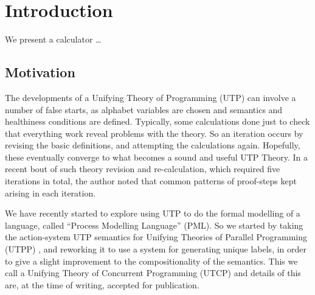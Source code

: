 \section{Introduction}\label{sec:Intro}

We present a calculator \dots

\subsection{Motivation}

The developments of a Unifying Theory of Programming (UTP)
can involve a number of false starts,
as alphabet variables are chosen
and semantics and healthiness conditions are defined.
Typically, some calculations done just to check that everything
work reveal problems with the theory.
So an iteration occurs by revising the basic definitions,
and attempting the calculations again.
Hopefully, these eventually converge to what becomes a sound and useful
UTP Theory.
In a recent bout of such theory revision and re-calculation,
which required five iterations in total,
the author noted that common patterns of proof-steps kept arising
in each iteration.

We have recently started to explore using UTP
to do the  formal modelling of a language,
called ``Process Modelling Language''
(PML)\cite{DBLP:journals/infsof/AtkinsonWN07}.
So we started by taking the action-system UTP semantics for Unifying Theories
of Parallel Programming (UTPP) \cite{DBLP:conf/icfem/WoodcockH02},
and reworking it to use a system for generating unique labels,
in order to give a slight improvement to the compositionality
of the semantics. This we call a Unifying Theory of Concurrent Programming
(UTCP) and details of this are,
at the time of writing,
accepted for publication\cite{conf/tase/BMN16}.

